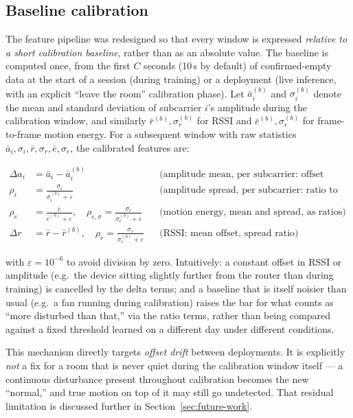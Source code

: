 \documentclass[11pt,a4paper]{article}
\begin{document}
\subsection{Baseline calibration}

The feature pipeline was redesigned so that every window is expressed
\emph{relative to a short calibration baseline}, rather than as an
absolute value. The baseline is computed once, from the first
\(C\) seconds (10\,s by default) of confirmed-empty data at the start
of a session (during training) or a deployment (live inference, with an
explicit ``leave the room'' calibration phase). Let $\bar{a}_i^{(b)}$
and $\sigma_i^{(b)}$ denote the mean and standard deviation of subcarrier
$i$'s amplitude during the calibration window, and similarly
$\bar{r}^{(b)}, \sigma_r^{(b)}$ for RSSI and $\bar{e}^{(b)},
\sigma_e^{(b)}$ for frame-to-frame motion energy. For a subsequent
window with raw statistics $\bar{a}_i, \sigma_i, \bar{r}, \sigma_r,
\bar{e}, \sigma_e$, the calibrated features are:

\begin{align}
    \Delta a_i &= \bar{a}_i - \bar{a}_i^{(b)}
        &&\text{(amplitude mean, per subcarrier: offset removed)} \\
    \rho_i &= \frac{\sigma_i}{\sigma_i^{(b)} + \varepsilon}
        &&\text{(amplitude spread, per subcarrier: ratio to baseline noise floor)} \\
    \rho_e &= \frac{\bar{e}}{\bar{e}^{(b)} + \varepsilon}, \quad
    \rho_{e,\sigma} = \frac{\sigma_e}{\sigma_e^{(b)} + \varepsilon}
        &&\text{(motion energy, mean and spread, as ratios)} \\
    \Delta r &= \bar{r} - \bar{r}^{(b)}, \quad
    \rho_r = \frac{\sigma_r}{\sigma_r^{(b)} + \varepsilon}
        &&\text{(RSSI: mean offset, spread ratio)}
\end{align}

with $\varepsilon = 10^{-6}$ to avoid division by zero. Intuitively: a
constant offset in RSSI or amplitude (e.g.\ the device sitting slightly
further from the router than during training) is cancelled by the delta
terms; and a baseline that is itself noisier than usual (e.g.\ a fan
running during calibration) raises the bar for what counts as
``more disturbed than that,'' via the ratio terms, rather than being
compared against a fixed threshold learned on a different day under
different conditions.

This mechanism directly targets \emph{offset drift} between deployments.
It is explicitly \emph{not} a fix for a room that is never quiet during
the calibration window itself --- a continuous disturbance present
throughout calibration becomes the new ``normal,'' and true motion on
top of it may still go undetected. That residual limitation is discussed
further in Section~\ref{sec:future-work}.
\end{document}
